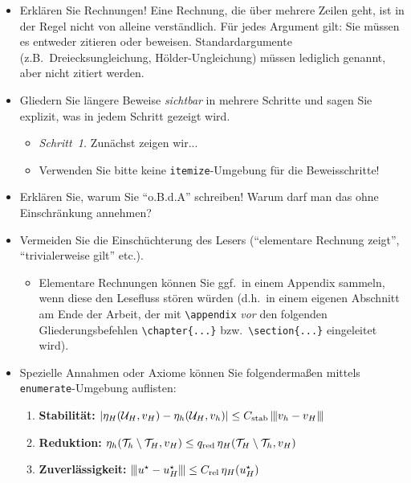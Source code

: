 \begin{itemize}
  \item Erklären Sie Rechnungen! Eine Rechnung, die über mehrere Zeilen geht, ist in der Regel nicht von alleine verständlich. Für jedes Argument gilt: Sie müssen es entweder zitieren oder beweisen. Standardargumente (z.B.\ Dreiecksungleichung, H\"older-Ungleichung) müssen lediglich genannt, aber nicht zitiert werden.

  \item Gliedern Sie längere Beweise \emph{sichtbar} in mehrere Schritte und sagen Sie explizit, was in jedem Schritt gezeigt wird.
        \begin{itemize}
          \item \emph{Schritt~1.} Zunächst zeigen wir...
          \item Verwenden Sie bitte keine \verb$itemize$-Umgebung für die Beweisschritte!
        \end{itemize}

  \item Erklären Sie, warum Sie "`o.B.d.A"' schreiben! Warum darf man das ohne Einschrän\-kung annehmen?

  \item Vermeiden Sie die Einschüchterung des Lesers ("`elementare Rechnung zeigt"', "`trivialerweise gilt"' etc.).
        \begin{itemize}
          \item Elementare Rechnungen können Sie ggf.\ in einem Appendix sammeln, wenn diese den Lesefluss stören würden (d.h.\ in einem eigenen Abschnitt am Ende der Arbeit, der mit \verb$\appendix$ \emph{vor} den folgenden Gliederungsbefehlen \verb$\chapter{...}$ bzw.\ \verb$\section{...}$ eingeleitet wird).
        \end{itemize}

  \item Spezielle Annahmen oder Axiome können Sie folgendermaßen mittels \verb$enumerate$-Umgebung auflisten:
  
  \begin{enumerate}[itemsep=-.5ex,partopsep=1ex,parsep=1ex,leftmargin=*,labelindent=2ex,label=\upshape\bfseries(A\arabic*), ref=\ensuremath{\mathrm{A\arabic*}}]
    \item\label{axiom:stability}
      \textbf{Stabilität:}\; $|\eta_H(\mathcal{U}_H, v_H) - \eta_h(\mathcal{U}_H, v_h)| \leq C_{\textnormal{stab}} \, |\mkern-1.5mu|\mkern-1.5mu| v_h - v_H |\mkern-1.5mu|\mkern-1.5mu|$
    \item\label{axiom:reduction}
      \textbf{Reduktion:}\; $\eta_h(\mathcal{T}_h \setminus \mathcal{T}_H, v_H) \leq q_{\textnormal{red}} \, \eta_H(\mathcal{T}_H \setminus \mathcal{T}_h, v_H)$
    \item\label{axiom:reliability}
      \textbf{Zuverlässigkeit:}\; $|\mkern-1.5mu|\mkern-1.5mu| u^\star - u_H^\star |\mkern-1.5mu|\mkern-1.5mu| \leq C_{\textnormal{rel}} \, \eta_H(u_H^\star)$
  \end{enumerate}


\end{itemize}
